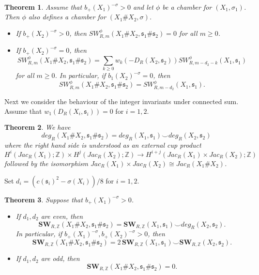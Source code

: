 \documentclass{amsart}
\newtheorem{theorem}{Theorem}[section]
\theoremstyle{definition}
\theoremstyle{remark}
\numberwithin{equation}{section}
\begin{document}
\begin{theorem}
Assume that $b_+(X_1)^{-\sigma} > 0$ and let $\phi$ be a chamber for $(X_1 , \sigma_1)$. Then $\phi$ also defines a chamber for $(X_1 \# X_2 , \sigma )$.
\begin{itemize}
\item[(1)]{If $b_+(X_2)^{-\sigma} > 0$, then $SW^\phi_{R,m}(X_1 \# X_2 , \mathfrak{s}_1 \# \mathfrak{s}_2) = 0$ for all $m \ge 0$.}
\item[(2)]{If $b_+(X_2)^{-\sigma} = 0$, then
\[
SW^\phi_{R,m}(X_1 \# X_2 , \mathfrak{s}_1 \# \mathfrak{s}_2) = \sum_{k \ge 0} w_k( -D_R(X_2,\mathfrak{s}_2) ) SW^\phi_{R,m-d_2-k}(X_1 , \mathfrak{s}_1)
\]
for all $m \ge 0$. In particular, if $b_1(X_2)^{-\sigma} = 0$, then
\[
SW^\phi_{R,m}(X_1 \# X_2 , \mathfrak{s}_1 \# \mathfrak{s}_2) = SW^\phi_{R,m-d_2}(X_1 , \mathfrak{s}_1).
\]
}
\end{itemize}

\end{theorem}

Next we consider the behaviour of the integer invariants under connected sum. Assume that $w_1(D_R(X_i , \mathfrak{s}_i)) = 0$ for $i=1,2$.

\begin{theorem}
We have
\[
deg_R(X_1 \# X_2 , \mathfrak{s}_1 \# \mathfrak{s}_2) = deg_R(X_1 ,\mathfrak{s}_1) \smallsmile deg_R(X_2 , \mathfrak{s}_2)
\]
where the right hand side is understood as an external cup product
\[
H^i( Jac_R(X_1) ; \mathbb{Z}) \times H^j( Jac_R(X_2) ; \mathbb{Z}) \to H^{i+j}(Jac_R(X_1) \times Jac_R(X_2) ; \mathbb{Z} )
\]
followed by the isomorphism $Jac_R(X_1) \times Jac_R(X_2) \cong Jac_R(X_1 \# X_2)$.
\end{theorem}

Set $d_i = (c(\mathfrak{s}_i)^2 - \sigma(X_i))/8$ for $i=1,2$.

\begin{theorem}
Suppose that $b_+(X_1)^{-\sigma} > 0$.
\begin{itemize}
\item[(1)]{If $d_1,d_2$ are even, then
\[
\mathbf{SW}_{R,\mathbb{Z}}(X_1 \# X_2 , \mathfrak{s}_1 \# \mathfrak{s}_2) = \mathbf{SW}_{R,\mathbb{Z}}(X_1 , \mathfrak{s}_1) \smallsmile deg_R(X_2 , \mathfrak{s}_2).
\]
In particular, if $b_+(X_1)^{-\sigma}, b_+(X_2)^{-\sigma} > 0$, then
\[
\mathbf{SW}_{R,\mathbb{Z}}(X_1 \# X_2 , \mathfrak{s}_1 \# \mathfrak{s}_2) = 2 \, \mathbf{SW}_{R,\mathbb{Z}}(X_1 , \mathfrak{s}_1) \smallsmile \mathbf{SW}_{R,\mathbb{Z}}(X_2, \mathfrak{s}_2).
\]
}
\item[(2)]{If $d_1,d_2$ are odd, then
\[
\mathbf{SW}_{R,\mathbb{Z}}(X_1 \# X_2 , \mathfrak{s}_1 \# \mathfrak{s}_2) = 0.
\]
}
\end{itemize}

\end{theorem}
\end{document}
